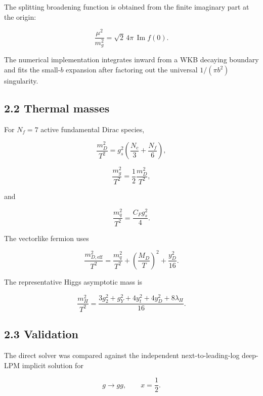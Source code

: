 \documentclass[
  10pt,
]{article}
\begin{document}
The splitting broadening function is obtained from the finite imaginary
part at the origin:

\[
\boxed{
\frac{\mu^2}{m_g^2}
=
\sqrt2\,4\pi\,\operatorname{Im}f(0).
}
\]

The numerical implementation integrates inward from a WKB decaying
boundary and fits the small-\(b\) expansion after factoring out the
universal \(1/(\pi b^2)\) singularity.

\subsection{2.2 Thermal masses}\label{thermal-masses}

For \(N_f=7\) active fundamental Dirac species,

\[
\frac{m_D^2}{T^2}
=
g_s^2
\left(
\frac{N_c}{3}+\frac{N_f}{6}
\right),
\]

\[
\frac{m_g^2}{T^2}
=
\frac12\frac{m_D^2}{T^2},
\]

and

\[
\frac{m_q^2}{T^2}
=
\frac{C_Fg_s^2}{4}.
\]

The vectorlike fermion uses

\[
\frac{m_{D,\mathrm{eff}}^2}{T^2}
=
\frac{m_q^2}{T^2}
+
\left(\frac{M_D}{T}\right)^2
+
\frac{y_D^2}{16}.
\]

The representative Higgs asymptotic mass is

\[
\frac{m_H^2}{T^2}
=
\frac{
3g_2^2+g_Y^2+4y_t^2+4y_D^2+8\lambda_H
}{16}.
\]

\subsection{2.3 Validation}\label{validation}

The direct solver was compared against the independent
next-to-leading-log deep-LPM implicit solution for

\[
g\rightarrow gg,
\qquad
x=\frac12.
\]
\end{document}

